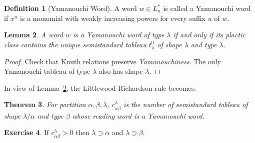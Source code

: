 \documentclass[11pt]{amsproc}
\newtheorem{theorem}{Theorem}[subsection]
\newtheorem{lemma}[theorem]{Lemma}
\theoremstyle{definition}
\newtheorem{definition}[theorem]{Definition}
\theoremstyle{example}
\newtheorem{exercise}[theorem]{Exercise}
\begin{document}
\begin{definition}
  [Yamanouchi Word]
  A word $w\in L_n^*$ is called a Yamanouchi word if $x^u$ is a monomial with weakly increasing powers for every suffix $u$ of $w$.
\end{definition}
\begin{lemma}
  \label{lemma:yamanouchi}
  A word $w$ is a Yamanouchi word of type $\lambda$ if and only if its plactic class contains the unique semistandard tableau $t^0_\lambda$ of shape $\lambda$ and type $\lambda$.
\end{lemma}
\begin{proof}
  Check that Knuth relations preserve \emph{Yamanouchiness}.
  The only Yamanouchi tableau of type $\lambda$ also has shape $\lambda$.
\end{proof}
In view of Lemma~\ref{lemma:yamanouchi}, the Littlewood-Richardson rule becomes:
\begin{theorem}
  For partition $\alpha,\beta,\lambda$, $c^\lambda_{\alpha\beta}$ is the number of semistandard tableau of shape $\lambda/\alpha$ and type $\beta$ whose reading word is a Yamanouchi word.
\end{theorem}
\begin{exercise}
  If $c^\lambda_{\alpha\beta}>0$ then $\lambda\supset \alpha$ and $\lambda\supset \beta$.
\end{exercise}
\end{document}
